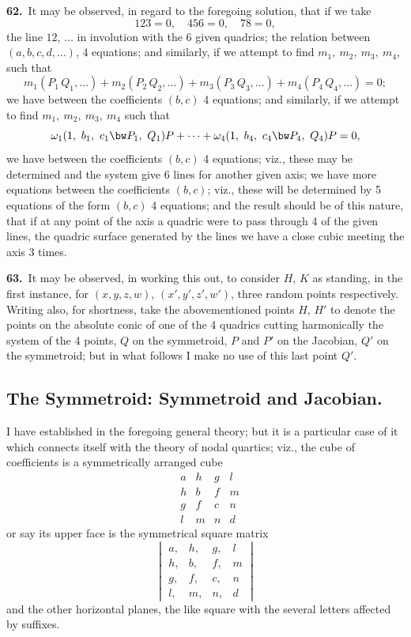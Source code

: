 \documentclass[11pt,a4paper]{article}
\begin{document}
\medskip

\textbf{62.}\ It may be observed, in regard to the foregoing solution, that if we take
\[
123 = 0,\quad 456 = 0,\quad 78 = 0,
\]
the line $12$, $\ldots$ in involution with the 6 given quadrics; the relation between $(a, b, c, d, \ldots)$, 4 equations; and similarly, if we attempt to find $m_1,\ m_2,\ m_3,\ m_4$, such that
\[
m_1(P_1\,Q_1,\ldots) + m_2(P_2\,Q_2,\ldots) + m_3(P_3\,Q_3,\ldots) + m_4(P_4\,Q_4,\ldots) = 0;
\]
we have between the coefficients $(b, c)$ 4 equations; and similarly, if we attempt to find $m_1,\ m_2,\ m_3,\ m_4$ such that
\[
\omega_1(1,\ b_1,\ c_1\bw P_1,\ Q_1)P + \cdots + \omega_4(1,\ b_4,\ c_4\bw P_4,\ Q_4)P = 0,
\]
we have between the coefficients $(b, c)$ 4 equations; viz., these may be determined and the system give 6 lines for another given axis;
we have more equations between the coefficients $(b, c)$; viz., these will be determined by 5 equations of the form $(b, c)$ 4 equations; and the result should be of this nature, that if at any point of the axis a quadric were to pass through 4 of the given lines, the quadric surface generated by the lines we have a close cubic meeting the axis 3 times.

\medskip

\textbf{63.}\ It may be observed, in working this out, to consider $H$, $K$ as standing, in the first instance, for $(x, y, z, w)$, $(x', y', z', w')$, three random points respectively. Writing also, for shortness, take the abovementioned points $H$, $H'$ to denote the points on the absolute conic of one of the 4 quadrics cutting harmonically the system of the 4 points, $Q$ on the symmetroid, $P$ and $P'$ on the Jacobian, $Q'$ on the symmetroid; but in what follows I make no use of this last point $Q'$.

\newpage
\setcounter{page}{156}

\subsection*{The Symmetroid: Symmetroid and Jacobian.}

\noindent I have established in the foregoing general theory; but it is a particular case of it which connects itself with the theory of nodal quartics; viz., the cube of coefficients is a symmetrically arranged cube
\[
\begin{matrix}
 & a & h & g & l\\
 & h & b & f & m\\
 & g & f & c & n\\
 & l & m & n & d
\end{matrix}
\]
or say its upper face is the symmetrical square matrix
\[
\begin{vmatrix}
a, & h, & g, & l\\
h, & b, & f, & m\\
g, & f, & c, & n\\
l, & m, & n, & d
\end{vmatrix}
\]
and the other horizontal planes, the like square with the several letters affected by suffixes.
\end{document}
